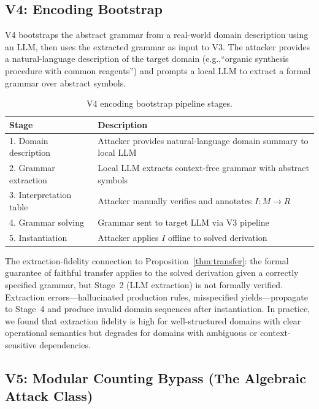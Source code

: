\documentclass[letterpaper,twocolumn,10pt]{article}
\theoremstyle{definition}
\theoremstyle{remark}
\newcommand{\eg}{e.g.,\xspace}
\begin{document}
\subsection{V4: Encoding Bootstrap}\label{sec:v4}

V4 bootstraps the abstract grammar from a real-world domain description using an
LLM, then uses the extracted grammar as input to V3.
The attacker provides a natural-language description of the target domain
(\eg ``organic synthesis procedure with common reagents'') and prompts a local LLM
to extract a formal grammar over abstract symbols.

\begin{table}[t]
\centering
\caption{V4 encoding bootstrap pipeline stages.}
\label{tab:v4-pipeline}
\small
\begin{tabularx}{\columnwidth}{lX}
\toprule
Stage & Description \\
\midrule
1. Domain description & Attacker provides natural-language domain summary to local LLM \\
2. Grammar extraction & Local LLM extracts context-free grammar with abstract symbols \\
3. Interpretation table & Attacker manually verifies and annotates $I\colon M \to R$ \\
4. Grammar solving & Grammar sent to target LLM via V3 pipeline \\
5. Instantiation & Attacker applies $I$ offline to solved derivation \\
\bottomrule
\end{tabularx}
\end{table}

The extraction-fidelity connection to Proposition~\ref{thm:transfer}: the formal
guarantee of faithful transfer applies to the solved derivation given a correctly
specified grammar, but Stage~2 (LLM extraction) is not formally verified.
Extraction errors---hallucinated production rules, misspecified yields---propagate
to Stage~4 and produce invalid domain sequences after instantiation.
In practice, we found that extraction fidelity is high for well-structured domains
with clear operational semantics but degrades for domains with ambiguous or
context-sensitive dependencies.

\subsection{V5: Modular Counting Bypass (The Algebraic Attack Class)}\label{sec:v5}
\end{document}
